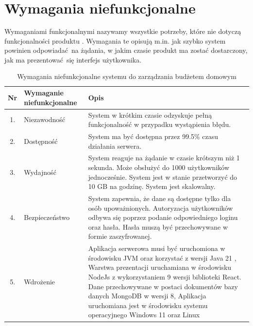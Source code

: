 \section{Wymagania niefunkcjonalne}
Wymaganiami funkcjonalnymi nazywamy wszystkie potrzeby, które nie dotyczą funkcjonalności produktu \cite{Wymagania}. Wymagania te opisują m.in. jak szybko system powinien odpowiadać na żądania, w jakim czasie produkt ma zostać dostarczony, jak ma prezentować się interfejs użytkownika. 
\begin{table}[H]
	\centering
	\renewcommand{\arraystretch}{1.3}
	\setlength{\tabcolsep}{6pt}
	\begin{tabular}{|c|p{3.1cm}|p{9.9cm}|}
		\hline
		\textbf{Nr} & \textbf{Wymaganie niefunkcjonalne} & \textbf{Opis} \\ \hline
		
		1. & Niezawodność & System w krótkim czasie odzyskuje pełną funkcjonalność w przypadku wystąpienia błędu. \\ \hline
		2. & Dostępność & System ma być dostępna przez 99.5\% czasu działania serwera.\\ \hline
		3. & Wydajność & System reaguje na żądanie w czasie krótszym niż 1 sekunda. Może obsłużyć do 1000 użytkowników jednocześnie. System jest w stanie przetworzyć do 10 GB na godzinę.  System jest skalowalny.\\ \hline
		4. & Bezpieczeństwo & System zapewnia, że dane są dostępne tylko dla osób upoważnionych. Autoryzacja użytkowników odbywa się poprzez podanie odpowiedniego loginu oraz hasła. Hasła muszą być przechowywane w formie zaszyfrowanej. \\ \hline
		5. & Wdrożenie & Aplikacja serwerowa musi być uruchomiona w środowisku JVM oraz korzystać z wersji Java 21 , Warstwa prezentacji uruchamiana w środowisku NodeJs z wykorzystaniem 9 wersji biblioteki React. Dane przechowywane w postaci dokumentów bazy danych MongoDB w wersji 8, Aplikacja uruchomiana jest w środowisku systemu operacyjnego Windows 11 oraz Linux \\ \hline
		
	\end{tabular}
	\caption{Wymagania niefunkcjonalne systemu do zarządzania budżetem domowym}
	\label{tab:wymagania_niefunkcjonalne}
\end{table}
